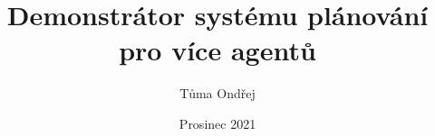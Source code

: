 \worktype [O/CZ]
\title {Demonstrátor systému plánování pro více agentů}
\author {Tůma Ondřej}
\supervisor {\kulich}
\date {Prosinec 2021}